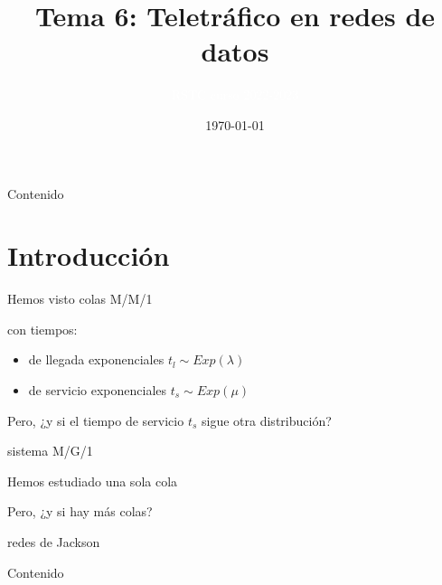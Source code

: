 \documentclass[xcolor={x11names}]{beamer}
\title[Tema 6]{Tema 6: Teletráfico en redes de datos}
\author{\textcolor{white}{RSTC curso 2022-2023}}
\date{\today}
\begin{document}
\frame{\titlepage}


\begin{frame}{Contenido}
    \tableofcontents
\end{frame}




\section{Introducción}
\begin{frame}{\secname}
    Hemos visto colas M/M/1
    \begin{figure}
        
    \end{figure}
    con tiempos:
    \begin{itemize}
        \item de llegada exponenciales
            $t_l\sim Exp(\lambda)$
        \item de servicio exponenciales
            $t_s\sim Exp(\mu)$
    \end{itemize}

    \pause
    \vfill

    {\color{blue}
    Pero, ¿y si el tiempo de servicio $t_s$
    sigue otra distribución?
    }
     
    \pause
    \begin{itemize}
        {\color{red}
        \item sistema M/G/1
        }
    \end{itemize}
\end{frame}



\begin{frame}{\secname}
    Hemos estudiado una sola cola
    \begin{figure}
        
    \end{figure}

    \vfill
    {\color{blue}
    Pero, ¿y si hay más colas?
    }
    \pause
    \begin{itemize}
        {\color{red}
        \item redes de Jackson
        }
    \end{itemize}
    \begin{figure}
        
    \end{figure}
\end{frame}


\begin{frame}{Contenido}
    \tableofcontents
\end{frame}
\end{document}
